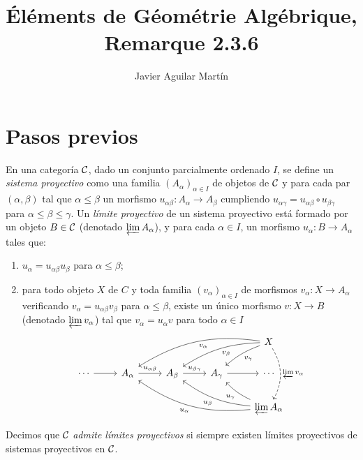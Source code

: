 \documentclass[twoside]{article}
\begin{document}
\title{Éléments de Géométrie Algébrique, Remarque 2.3.6}
\author{Javier Aguilar Martín}
\maketitle

\section{Pasos previos}

\begin{defi}[EGA, 1.1.9]
En una categoría ${\mathcal C}$, dado un conjunto parcialmente ordenado $I$, se define un \emph{sistema proyectivo} como una familia $(A_\alpha)_{\alpha\in I}$ de objetos de ${\mathcal C}$ y para cada par $(\alpha,\beta)$ tal que $\alpha\leq\beta$ un morfismo $u_{\alpha\beta}:A_\alpha\to A_\beta$ cumpliendo $u_{\alpha\gamma}=u_{\alpha\beta}\circ u_{\beta\gamma}$ para $\alpha\leq\beta\leq\gamma$. Un \emph{límite proyectivo} de un sistema proyectivo está formado por un objeto $B\in{\mathcal C}$ (denotado $\varprojlim A_\alpha$), y para cada $\alpha\in I$, un morfismo $u_\alpha:B\to A_\alpha$ tales que: 
\begin{enumerate}
\item $u_\alpha=u_{\alpha\beta}u_{\beta}$ para $\alpha\leq\beta$;
\item para todo objeto $X$ de $C$ y toda familia $(v_\alpha)_{\alpha\in I}$ de morfismos $v_\alpha:X\to A_{\alpha}$ verificando $v_\alpha=u_{\alpha\beta}v_{\beta}$ para $\alpha\leq\beta$, existe un único morfismo $v:X\to B$ (denotado $\varprojlim v_\alpha$) tal que $v_\alpha=u_\alpha v$ para todo $\alpha\in I$
\[
\begin{tikzcd}
& & & & X\arrow[dlll, bend left=-20, "v_\alpha"]\arrow[dll, bend left=-15, "v_\beta"]\arrow[dl, bend left=-10, "v_\gamma"]\arrow[dd, dashed, bend left, "\varprojlim v_\alpha"]\\
\cdots\arrow[r] &A_\alpha \arrow[r, "u_{\alpha\beta}"] & A_\beta \arrow[r, "u_{\beta\gamma}"] & A_\gamma\arrow[r] &\cdots\\
&  & & & \varprojlim A_\alpha\arrow[ulll, bend left=20, "u_\alpha"]\arrow[ull, bend left=15, "u_\beta"]\arrow[ul, bend left=10, "u_\gamma"]
\end{tikzcd}
\]
\end{enumerate}
Decimos que ${\mathcal C}$ \emph{admite límites proyectivos} si siempre existen límites proyectivos de sistemas proyectivos en ${\mathcal C}$. 
\end{defi}
\end{document}
